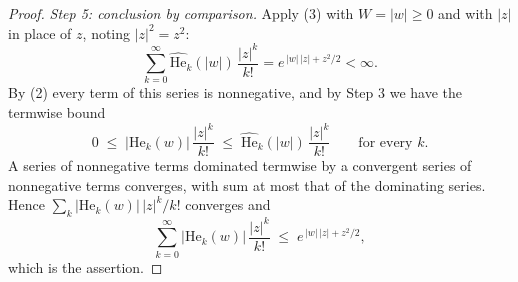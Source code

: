 \begin{proof}
\emph{Step 5: conclusion by comparison.}
Apply (3) with $W = |w| \geq 0$ and with $|z|$ in place of $z$, noting
$|z|^2 = z^2$:
\[
  \sum_{k=0}^\infty \widehat{\mathrm{He}}_k(|w|)\,\frac{|z|^k}{k!}
    = e^{\,|w|\,|z| + z^2/2} < \infty .
\]
By (2) every term of this series is nonnegative, and by Step 3 we have the
termwise bound
\[
  0 \;\leq\; \bigl|\mathrm{He}_k(w)\bigr|\,\frac{|z|^k}{k!}
    \;\leq\; \widehat{\mathrm{He}}_k(|w|)\,\frac{|z|^k}{k!}
  \qquad\text{for every } k .
\]
A series of nonnegative terms dominated termwise by a convergent series of
nonnegative terms converges, with sum at most that of the dominating series.
Hence $\sum_k |\mathrm{He}_k(w)|\,|z|^k/k!$ converges and
\[
  \sum_{k=0}^\infty \bigl|\mathrm{He}_k(w)\bigr|\,\frac{|z|^k}{k!}
    \;\leq\; e^{\,|w|\,|z| + z^2/2},
\]
which is the assertion.
\end{proof}

